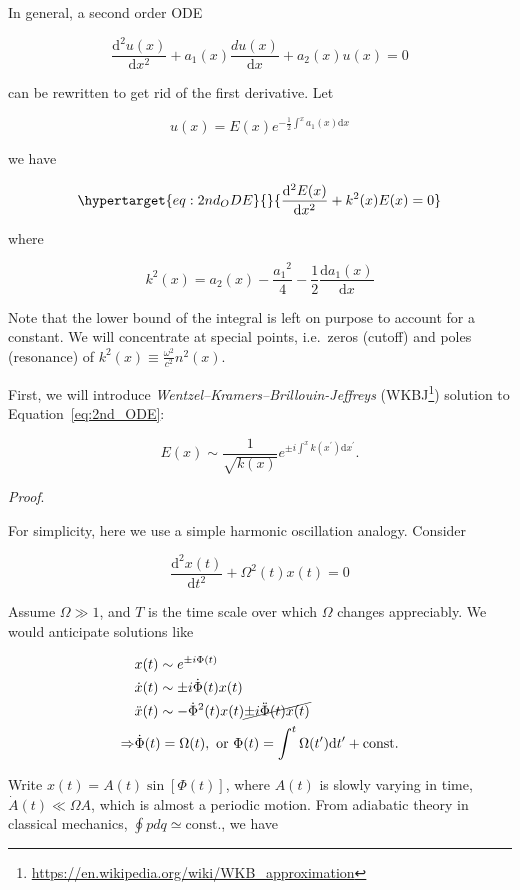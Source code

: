 \documentclass[
  notoc %
]{tufte-book}
\DeclareRobustCommand{\href}[2]{#2\footnote{\url{#1}}}
\begin{document}
In general, a second order ODE

\[
\frac{\mathrm{d}^2 u(x)}{\mathrm{d}x^2} + a_1(x)\frac{du(x)}{\mathrm{d}x} + a_2(x)u(x) = 0
\]

can be rewritten to get rid of the first derivative. Let

\[
u(x) = E(x) e^{-\frac{1}{2}\int^x a_1(x)\mathrm{d}x}
\]

we have

\begin{equation}\protect\hypertarget{eq:2nd_ODE}{}{
\frac{\mathrm{d}^2 E(x)}{\mathrm{d}x^2} + k^2(x) E(x) = 0
}\label{eq:2nd_ODE}\end{equation}

where

\[
k^2(x) = a_2(x) - \frac{{a_1}^2}{4} -\frac{1}{2}\frac{\mathrm{d} a_1(x)}{\mathrm{d}x}
\]

Note that the lower bound of the integral is left on purpose to account
for a constant. We will concentrate at special points, i.e.~zeros
(cutoff) and poles (resonance) of
\(k^2(x)\equiv \frac{\omega^2}{c^2}n^2(x)\).

First, we will introduce \emph{Wentzel--Kramers--Brillouin-Jeffreys}
(\href{https://en.wikipedia.org/wiki/WKB_approximation}{WKBJ}) solution
to Equation~\ref{eq:2nd_ODE}:

\[
E(x) \sim \frac{1}{\sqrt{k(x)}}e^{\pm i\int^x k(x^\prime)\mathrm{d}x^\prime}.
\]

\emph{Proof}.

For simplicity, here we use a simple harmonic oscillation analogy.
Consider

\[
\frac{\mathrm{d}^2 x(t)}{\mathrm{d}t^2} + \Omega^2(t)x(t) = 0
\]

Assume \(\Omega \gg 1\), and \(T\) is the time scale over which
\(\Omega\) changes appreciably. We would anticipate solutions like

\[
\begin{aligned}
&x(t)\sim e^{\pm i \Phi(t)} \\
&\dot{x}(t) \sim \pm i \dot{\Phi}(t) x(t) \\
&\ddot{x}(t) \sim - \dot{\Phi}^2(t) x(t) \cancel{\pm i \ddot{\Phi}(t)x(t)} \\
\Rightarrow &\dot{\Phi}(t) = \Omega(t),\ \text{or } \Phi(t) = \int^t \Omega(t^\prime) \mathrm{d}t^\prime + \text{const.}
\end{aligned}
\]

Write \(x(t) = A(t)\sin{[\Phi(t)]}\), where \(A(t)\) is slowly varying
in time, \(\dot{A}(t)\ll \Omega A\), which is almost a periodic motion.
From adiabatic theory in classical mechanics,
\(\oint pdq \simeq \text{const.}\), we have
\end{document}
